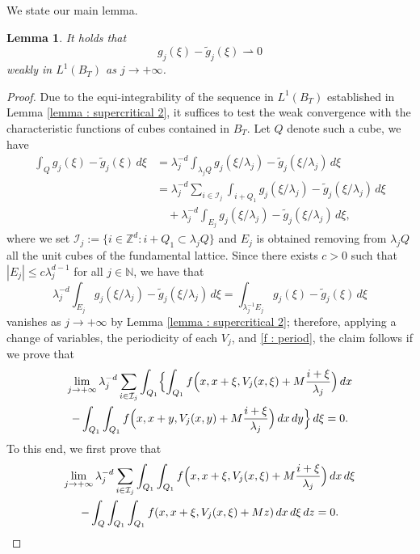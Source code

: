\documentclass{article}
\newtheorem{lemma}{Lemma}[section]
\theoremstyle{definition}
\newcommand{\N}{\mathbb{N}}
\begin{document}
We state our main lemma.

\begin{lemma}\label{lemma : supercritical 3}
    It holds that
    \begin{equation*}
        g_j(\xi)- \widetilde{g}_j(\xi) \rightharpoonup 0
    \end{equation*}
    weakly in $L^1(B_T)$ as $j\to+\infty$.
\end{lemma}
\begin{proof}
    Due to the equi-integrability of the sequence in $L^1(B_T)$ established in Lemma \ref{lemma : supercritical 2}, it suffices to test the weak convergence with the characteristic functions of cubes contained in $B_T$. Let $Q$ denote such a cube, we have
\begin{align*}
\int_Q g_j(\xi)-\widetilde{g}_j(\xi)\, d\xi  & = \lambda_j^{-d} \int_{\lambda_jQ} g_j(\xi/\lambda_j)- \widetilde{g}_j(\xi/\lambda_j)\,d\xi \\
& = \lambda_j^{-d} \sum_{i\in \mathcal{I}_j}\int_{i+Q_1} g_j(\xi/\lambda_j)- \widetilde{g}_j(\xi/\lambda_j)\,d\xi \\
& \quad + \lambda_j^{-d} \int_{E_j} g_j(\xi/\lambda_j)- \widetilde{g}_j(\xi/\lambda_j)\,d\xi,
\end{align*}
where we set $\mathcal{I}_j:=\{i\in \mathbb Z^d : i+Q_1\subset \lambda_jQ\}$ and $E_j$ is obtained removing from $\lambda_jQ$ all the unit cubes of the fundamental lattice. Since there exists $c>0$ such that $|E_j|\leq c\lambda_j^{d-1}$ for all $j\in\N$, we have that
\begin{equation*}
    \lambda_j^{-d} \int_{E_j} g_j(\xi/\lambda_j)- \widetilde{g}_j(\xi/\lambda_j)\,d\xi =  \int_{\lambda_j^{-1}E_j} g_j(\xi)- \widetilde{g}_j(\xi)\,d\xi
\end{equation*}
vanishes as $j\to+\infty$ by Lemma \ref{lemma : supercritical 2}; therefore, applying a change of variables, the periodicity of each $V_j$, and \eqref{f : period}, the claim follows if we prove that
\begin{multline}\label{superclaim}
    \lim_{j\to+\infty } \lambda_j^{-d} \sum_{i\in \mathcal{I}_j}\int_{Q_1} \Bigl\{ \int_{Q_1} f\Bigl(x,x+\xi,V_j(x,\xi)+ M\frac{i+\xi}{\lambda_j}\Bigr)\, dx\\ 
     - \int_{Q_1} \int_{Q_1} f\Bigl(x,x+y,V_j(x,y)+M\frac{i+\xi}{\lambda_j}\Bigr)\, dx\, dy\Bigr\}\, d\xi =0.
\end{multline}
To this end, we first prove that
\begin{multline}\label{subsuperclaim1}
    \lim_{j\to+\infty } \lambda_j^{-d} \sum_{i\in \mathcal{I}_j}\int_{Q_1}  \int_{Q_1} f\Bigl(x,x+\xi,V_j(x,\xi)+ M\frac{i+\xi}{\lambda_j}\Bigr)\, dx\,d\xi \\ -\int_Q \int_{Q_1} \int_{Q_1} f(x,x+\xi,V_j(x,\xi)+Mz)\,dx \, d\xi\, dz =0.

\end{multline}
\end{proof}
\end{document}
